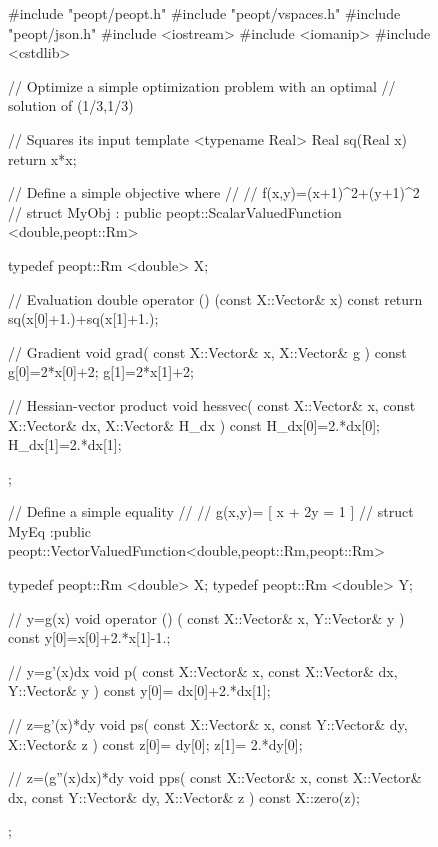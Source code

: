 \begin{figure}
    \begin{lstCpp}
#include "peopt/peopt.h"
#include "peopt/vspaces.h"
#include "peopt/json.h"
#include <iostream>
#include <iomanip>
#include <cstdlib>

// Optimize a simple optimization problem with an optimal 
// solution of (1/3,1/3)

// Squares its input
template <typename Real>
Real sq(Real x){
    return x*x;
}

// Define a simple objective where 
// 
// f(x,y)=(x+1)^2+(y+1)^2
//
struct MyObj
    : public peopt::ScalarValuedFunction <double,peopt::Rm>
{
    typedef peopt::Rm <double> X;

    // Evaluation 
    double operator () (const X::Vector& x) const {
        return sq(x[0]+1.)+sq(x[1]+1.);
    }

    // Gradient
    void grad(
        const X::Vector& x,
        X::Vector& g
    ) const {
        g[0]=2*x[0]+2;
        g[1]=2*x[1]+2;
    }

    // Hessian-vector product
    void hessvec(
        const X::Vector& x,
        const X::Vector& dx,
        X::Vector& H_dx
    ) const {
        H_dx[0]=2.*dx[0];
        H_dx[1]=2.*dx[1];
    }
};
\end{lstCpp}
\end{figure}
\begin{figure}
    \ContinuedFloat
    \begin{lstCpp}
// Define a simple equality
//
// g(x,y)= [ x + 2y = 1 ] 
//
struct MyEq
    :public peopt::VectorValuedFunction<double,peopt::Rm,peopt::Rm>
{
    typedef peopt::Rm <double> X;
    typedef peopt::Rm <double> Y;

    // y=g(x) 
    void operator () (
        const X::Vector& x,
        Y::Vector& y
    ) const {
        y[0]=x[0]+2.*x[1]-1.;
    }
    
    // y=g'(x)dx
    void p(
        const X::Vector& x,
        const X::Vector& dx,
        Y::Vector& y
    ) const { 
        y[0]= dx[0]+2.*dx[1];
    }
    
    // z=g'(x)*dy
    void ps(
        const X::Vector& x,
        const Y::Vector& dy,
        X::Vector& z
    ) const { 
        z[0]= dy[0];
        z[1]= 2.*dy[0];
    }
    
    // z=(g''(x)dx)*dy
    void pps( 
        const X::Vector& x,
        const X::Vector& dx,
        const Y::Vector& dy,
        X::Vector& z
    ) const {
        X::zero(z);
    }
};
\end{lstCpp}
\end{figure}
